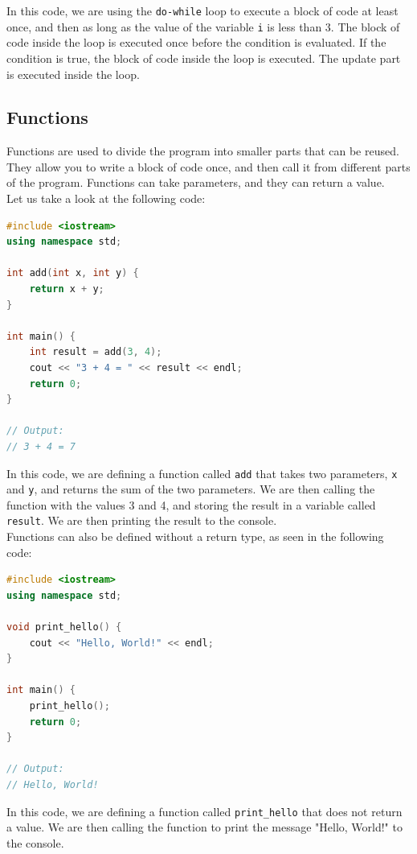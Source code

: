 In this code, we are using the \texttt{do-while} loop to execute a block of code at least once, and then as long as the value
of the variable \texttt{i} is less than 3. The block of code inside the loop is executed once before the condition is evaluated.
If the condition is true, the block of code inside the loop is executed. The update part is executed inside the loop.\\

\subsection{Functions}

Functions are used to divide the program into smaller parts that can be reused. They allow you to write a block of code once,
and then call it from different parts of the program. Functions can take parameters, and they can return a value.\\

Let us take a look at the following code:

\begin{lstlisting}[language=C++]
#include <iostream>
using namespace std;

int add(int x, int y) {
    return x + y;
}

int main() {
    int result = add(3, 4);
    cout << "3 + 4 = " << result << endl;
    return 0;
}

// Output:
// 3 + 4 = 7
\end{lstlisting}

In this code, we are defining a function called \texttt{add} that takes two parameters, \texttt{x} and \texttt{y}, and returns
the sum of the two parameters. We are then calling the function with the values 3 and 4, and storing the result in a variable
called \texttt{result}. We are then printing the result to the console.\\

Functions can also be defined without a return type, as seen in the following code:

\begin{lstlisting}[language=C++]
#include <iostream>
using namespace std;

void print_hello() {
    cout << "Hello, World!" << endl;
}

int main() {
    print_hello();
    return 0;
}

// Output:
// Hello, World!
\end{lstlisting}

In this code, we are defining a function called \texttt{print\_hello} that does not return a value. We are then calling the
function to print the message "Hello, World!" to the console.\\

